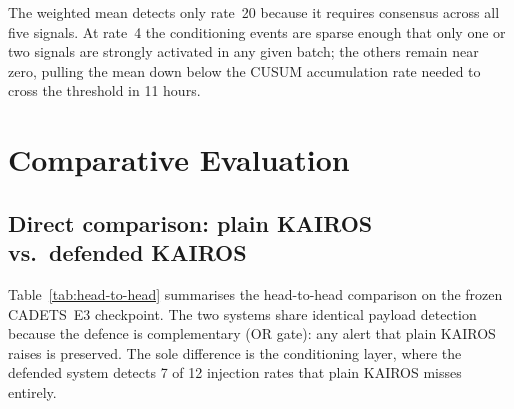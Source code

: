 \documentclass[10pt,twocolumn]{article}
\begin{document}
The weighted mean detects only rate~20 because it requires consensus across
all five signals.  At rate~4 the conditioning events are sparse enough that
only one or two signals are strongly activated in any given batch; the others
remain near zero, pulling the mean down below the CUSUM accumulation rate
needed to cross the threshold in 11 hours.

\section{Comparative Evaluation}
\label{sec:comparison}

\subsection{Direct comparison: plain KAIROS vs.\ defended KAIROS}
\label{sec:comp-direct}

Table~\ref{tab:head-to-head} summarises the head-to-head comparison on
the frozen CADETS~E3 checkpoint.  The two systems share identical payload
detection because the defence is complementary (OR gate): any alert that
plain KAIROS raises is preserved.  The sole difference is the conditioning
layer, where the defended system detects 7 of 12 injection rates that plain
KAIROS misses entirely.
\end{document}

